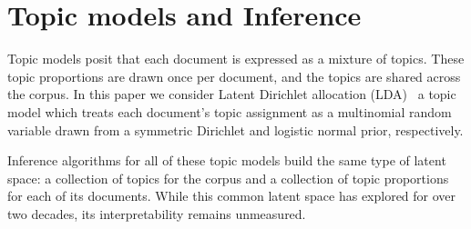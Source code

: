 \section{Topic models and Inference}
\label{sec:models}




Topic models posit that each document is expressed as a mixture of
topics.  These topic proportions are drawn once per document, and the
topics are shared across the corpus.  In this paper we consider Latent
Dirichlet allocation (LDA)~\cite{blei-03} a topic model which treats
each document's topic assignment as a multinomial random variable
drawn from a symmetric Dirichlet and logistic normal prior,
respectively.

Inference algorithms for all of these topic models build the same type
of latent space: a collection of topics for the corpus and a
collection of topic proportions for each of its documents.  While this
common latent space has explored for over two decades, its
interpretability remains unmeasured.


